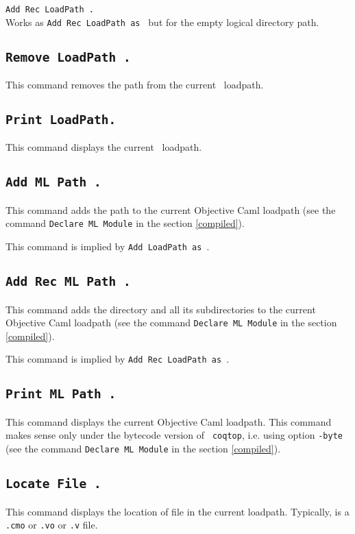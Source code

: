 \begin{Variants}
\item {\tt Add Rec LoadPath {\str}.}\\
Works as {\tt Add Rec LoadPath {\str} as {\dirpath}} but for the empty logical directory path.
\end{Variants}

\subsection{\tt Remove LoadPath {\str}.}
This command removes the path {\str} from the current \Coq\ loadpath.

\subsection{\tt Print LoadPath.}
This command displays the current \Coq\ loadpath.

\subsection{\tt Add ML Path {\str}.}
This command adds the path {\str} to the current Objective Caml loadpath (see
the command {\tt Declare ML Module} in the section \ref{compiled}).

\Rem This command is implied by {\tt Add LoadPath {\str} as {\dirpath}}.

\subsection{\tt Add Rec ML Path {\str}.}
This command adds the directory {\str} and all its subdirectories 
to the current Objective Caml loadpath (see
the command {\tt Declare ML Module} in the section \ref{compiled}).

\Rem This command is implied by {\tt Add Rec LoadPath {\str} as {\dirpath}}.

\subsection{\tt Print ML Path {\str}.}
This command displays the current Objective Caml loadpath.
This command makes sense only under the bytecode version of {\tt
coqtop}, i.e. using option {\tt -byte} (see the
command {\tt Declare ML Module} in the section
\ref{compiled}).

\subsection{\tt Locate File {\str}.}\label{Locate File}
This command displays the location of file {\str} in the current loadpath.
Typically, {\str} is a \texttt{.cmo} or \texttt{.vo} or \texttt{.v} file.

